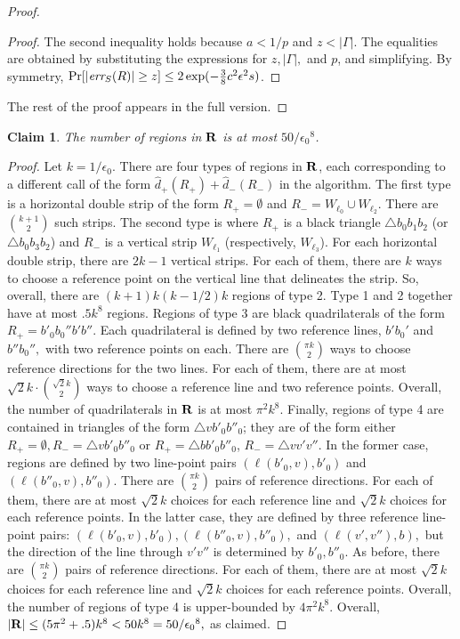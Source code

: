 \documentclass[11pt,english]{article}
\newtheorem{claim}[theorem]{Claim}
\numberwithin{figure}{section}
\newcommand{\stripset}{{\bf R}}
\newcommand{\err}{\mbox{\it err}_S}
\newcommand{\mydelta}{\epsilon} \newcommand{\bigdelta}{{\epsilon_0}} \newcommand{\dsquares}{d_{\rm squares}}
\newcommand{\dout}{\hat{d}}
\begin{document}
\begin{proof}
\begin{proof}
The second inequality holds because $a< 1/p$ and $z<|\Gamma|$.
The equalities are obtained by substituting the expressions for $z,|\Gamma|,$ and $p$, and simplifying.
By symmetry, $\Pr[|\err(R)|\geq z]\leq 2\exp(-\frac 3 8 c^2\mydelta^2 s)$.
\end{proof}
\ifnum{}
The rest of the proof appears in the {\color{black} full version}.
\end{proof}
\else
\begin{claim}\label{claim:convexity-approx-regions-count}
The number of regions in $\stripset$ is at most $50/\bigdelta^8$.
\end{claim}
\begin{proof}
Let $k=1/\bigdelta$. There are four types of regions in $\stripset$, each corresponding to a different call of the form $\dout_+(R_+)+\dout_-(R_-)$ in the algorithm. The first type is a horizontal double strip of the form $R_+=\emptyset$ and $R_-= W_{\ell_0}\cup W_{\ell_2}$. There are ${k+1}\choose 2$ such strips.
The second type is where $R_+$ is a black triangle $\bigtriangleup b_0b_1b_2$ (or $\bigtriangleup b_0b_3b_2$) and $R_-$ is a vertical strip $W_{\ell_1}$ (respectively, $W_{\ell_3}$). For each horizontal double strip, there are $2k-1$ vertical strips. For each of them, there are $k$ ways to choose a reference point on the vertical line that delineates the strip. So, overall, there are $(k+1)k(k-1/2)k$ regions of type 2. Type 1 and 2 together have at most $.5k^8$ regions.
Regions of type 3 are black quadrilaterals of the form $R_+=b'_0b_0''b'b''.$ Each quadrilateral is defined by two reference lines, $b'b_0'$ and $b''b_0'',$ with two reference points on each. There are ${\pi k} \choose 2$ ways to choose reference directions for the two lines. For each of them, there are at most $\sqrt 2 k\cdot {{\sqrt 2 k}\choose 2}$ ways to choose a reference line and two reference points. Overall, the number of quadrilaterals in $\stripset$ is at most $\pi^2 k^8$.
Finally, regions of type 4 are contained in triangles of the form $\bigtriangleup v b'_0 b''_0$; they are of the form either $R_+=\emptyset, R_-=\bigtriangleup v b'_0 b''_0$ or $R_+=\bigtriangleup bb'_0b''_0$, $R_-=\bigtriangleup vv'v''$. In the former case, regions are defined by two line-point pairs $(\ell(b'_0,v),b'_0)$ and $(\ell(b''_0,v),b''_0)$. There are ${\pi k} \choose 2$ pairs of reference directions. For each of them, there are at most $\sqrt 2 k$ choices for each reference line and $\sqrt 2 k$ choices for each reference points. In the latter case, they are defined by three reference line-point pairs: $(\ell(b'_0,v),b'_0),(\ell(b''_0,v),b''_0),$ and $(\ell(v',v''),b),$ but the direction of the line through $v'v''$ is determined by $b'_0,b''_0$. As before, there are ${\pi k} \choose 2$ pairs of reference directions. For each of them, there are at most $\sqrt 2 k$ choices for each reference line and $\sqrt 2k$ choices for each reference points. Overall, the number of regions of type 4 is upper-bounded by $4\pi^2 k^8$.
Overall, $|\stripset|\leq (5\pi^2+.5) k^8<50 k^8=50/\bigdelta^8,$ as claimed.
\end{proof}
\end{document}
